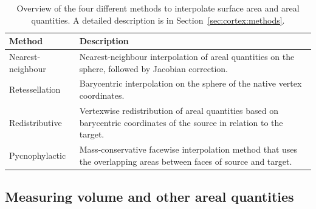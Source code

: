 \begin{table}[!tp]
\caption[Overview of the four different methods to interpolate surface area and areal quantities.]{Overview of the four different methods to interpolate surface area and areal quantities. A detailed description is in Section~\ref{sec:cortex:methods}.}
\begin{center}
\begin{small}
\begin{tabular}{@{}m{28mm}<{\raggedright}m{96mm}<{\raggedright}@{}}
\toprule
\textbf{Method} & \textbf{Description} \\ 
\midrule
Nearest-neighbour & Nearest-neighbour interpolation of areal quantities on the sphere, followed by Jacobian correction.\\
\midrule
Retessellation & Barycentric interpolation on the sphere of the native vertex coordinates.\\
\midrule
Redistributive & Vertexwise redistribution of areal quantities based on bary\-centric coordinates of the source in relation to the target.\\
\midrule
Pycnophylactic & Mass-conservative facewise interpolation method that uses the overlapping areas between faces of source and target.\\
\bottomrule
\end{tabular}
\end{small}
\end{center}
\label{tab:overview}
\end{table}

\subsection{Measuring volume and other areal quantities}

